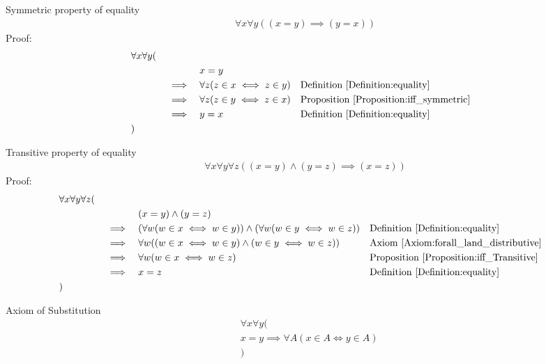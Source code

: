\begin{prop}
Symmetric property of equality
\begin{align*}
\forall x \forall y ((x = y) \implies (y=x))
\end{align*}
Proof:
\begin{align*}
& \forall x \forall y ( \\
& \quad &&  &&  x = y \\
& \quad && \implies &&  \forall z (z \in x \iff z \in y)
&& \text{Definition \ref{Definition:equality}} \\
& \quad && \implies &&  \forall z (z \in y \iff z \in x)
&& \text{Proposition \ref{Proposition:iff_symmetric}} \\
& \quad && \implies && y = x
&& \text{Definition \ref{Definition:equality}} \\
& )
\end{align*}
\end{prop}

\begin{prop}
Transitive property of equality
\begin{align*}
\forall x \forall y \forall z ((x = y) \land (y=z) \implies (x=z))
\end{align*}
Proof:
\begin{align*}
& \forall x \forall y \forall z ( \\
& \quad &&  &&  (x = y) \land (y=z) \\
& \quad && \implies && ( \forall w (w \in x \iff w \in y)) \land ( \forall w (w \in y \iff w \in z))
&& \text{Definition \ref{Definition:equality}} \\
& \quad && \implies && \forall w ((w \in x \iff w \in y) \land (w \in y \iff w \in z))
&& \text{Axiom \ref{Axiom:forall_land_distributive}} \\
& \quad && \implies && \forall w (w \in x \iff w \in z)
&& \text{Proposition \ref{Proposition:iff_Transitive}} \\
& \quad && \implies && x = z
&& \text{Definition \ref{Definition:equality}} \\
& )
\end{align*}
\end{prop}

\begin{axm}
Axiom of Substitution
\begin{align*}
& \forall x \forall y ( \\
& x = y \implies \forall A (x \in A  \iff y \in A) \\
& )
\end{align*}
\end{axm}

